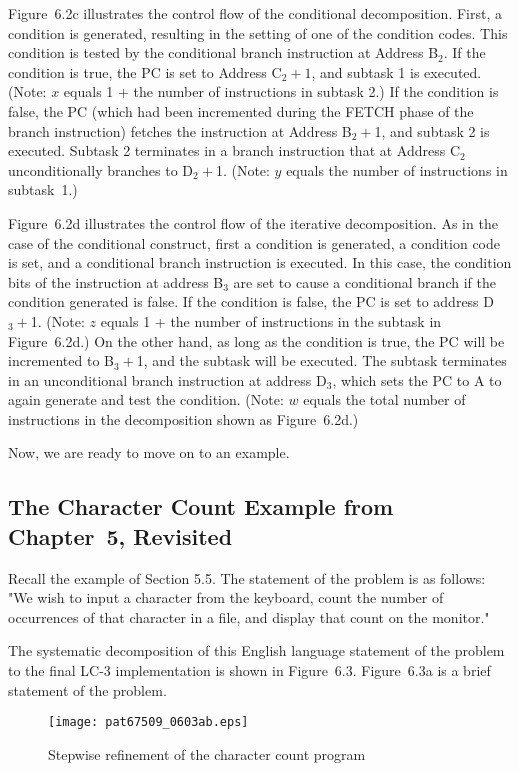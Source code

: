 \documentclass{patt}
\begin{document}
Figure~6.2c illustrates the control flow of the conditional
decomposition.  First, a condition is generated, resulting in
the setting of one of the condition codes.  This condition is
tested by the conditional branch instruction at Address B$_2$. If
the condition is true, the PC is set to Address C$_2{+}1$, and subtask
1 is executed. (Note: $x$ equals 1 + the number of instructions
in subtask 2.)  If the condition is false, the
PC (which had been incremented during the FETCH phase of the
branch instruction) fetches the instruction at Address B$_2+$1,
and subtask 2 is executed. Subtask 2 terminates in a branch
instruction that at Address C$_2$ unconditionally branches to D$_2+$1.
(Note: $y$ equals the number of instructions in subtask~1.)

Figure~6.2d illustrates the control flow of the iterative
decomposition. As in the case of the conditional construct,
first a condition is generated, a condition code is set,
and a conditional branch instruction is executed. In this case, the
condition bits of the instruction at address B$_3$ are set to
cause a conditional branch if the condition generated is false.
If the condition is false, the PC is set to address D$_3+$1.
(Note: $z$ equals 1 + the number of instructions in the subtask in
Figure~6.2d.) On the other hand, as long as the
condition is true, the PC will be incremented to B$_3+$1, and
the subtask will be executed. The subtask terminates in an
unconditional branch instruction at address D$_3$, which sets
the PC to A to again generate and test the condition.
(Note: $w$ equals the 
total number of instructions in the decomposition shown as Figure~6.2d.)

Now, we are ready to move on to an example.


\subsection{The Character Count Example from Chapter~5, Revisited}

Recall the example of Section 5.5. The
statement of the problem is as follows:
"We wish to input a character from the keyboard, count the number of 
occurrences of that character in a file, and display that count on the 
monitor."


The systematic decomposition of this English language statement of the
problem to the final LC-3 implementation is shown in Figure~6.3.
Figure~6.3a is a brief statement of the problem.

\begin{figure}
\centerline{\texttt{[image: pat67509\_0603ab.eps]}}
\caption{Stepwise refinement of the character
count program}
\label{fig:count1}
\vspace{-6pt}
\end{figure}
\end{document}
